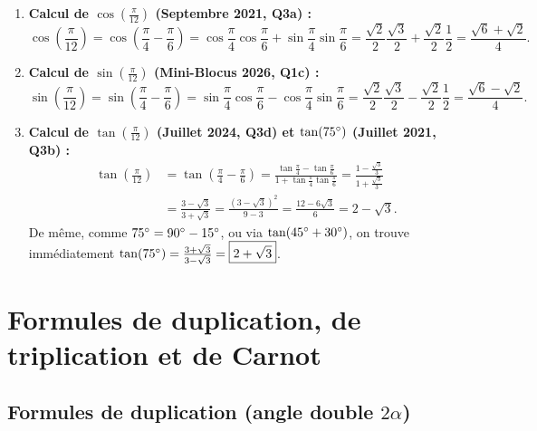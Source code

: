 \begin{exemple}
\begin{enumerate}
    \item \textbf{Calcul de $\cos\left(\frac{\pi}{12}\right)$ (Septembre 2021, Q3a) :}
    \[
        \cos\left(\frac{\pi}{12}\right) = \cos\left(\frac{\pi}{4} - \frac{\pi}{6}\right) = \cos\frac{\pi}{4}\cos\frac{\pi}{6} + \sin\frac{\pi}{4}\sin\frac{\pi}{6} = \frac{\sqrt{2}}{2}\frac{\sqrt{3}}{2} + \frac{\sqrt{2}}{2}\frac{1}{2} = \boxed{\frac{\sqrt{6} + \sqrt{2}}{4}}.
    \]
    \item \textbf{Calcul de $\sin\left(\frac{\pi}{12}\right)$ (Mini-Blocus 2026, Q1c) :}
    \[
        \sin\left(\frac{\pi}{12}\right) = \sin\left(\frac{\pi}{4} - \frac{\pi}{6}\right) = \sin\frac{\pi}{4}\cos\frac{\pi}{6} - \cos\frac{\pi}{4}\sin\frac{\pi}{6} = \frac{\sqrt{2}}{2}\frac{\sqrt{3}}{2} - \frac{\sqrt{2}}{2}\frac{1}{2} = \boxed{\frac{\sqrt{6} - \sqrt{2}}{4}}.
    \]
    \item \textbf{Calcul de $\tan\left(\frac{\pi}{12}\right)$ (Juillet 2024, Q3d) et $\tan(75\degree)$ (Juillet 2021, Q3b) :}
    \begin{align*}
        \tan\left(\frac{\pi}{12}\right) &= \tan\left(\frac{\pi}{4} - \frac{\pi}{6}\right) = \frac{\tan\frac{\pi}{4} - \tan\frac{\pi}{6}}{1 + \tan\frac{\pi}{4}\tan\frac{\pi}{6}} = \frac{1 - \frac{\sqrt{3}}{3}}{1 + \frac{\sqrt{3}}{3}} \\
        &= \frac{3 - \sqrt{3}}{3 + \sqrt{3}} = \frac{(3-\sqrt{3})^2}{9 - 3} = \frac{12 - 6\sqrt{3}}{6} = \boxed{2 - \sqrt{3}}.
    \end{align*}
    De même, comme $75\degree = 90\degree - 15\degree$, ou via $\tan(45\degree+30\degree)$, on trouve immédiatement $\tan(75\degree) = \frac{3+\sqrt{3}}{3-\sqrt{3}} = \boxed{2 + \sqrt{3}}$.
\end{enumerate}
\end{exemple}

\section{Formules de duplication, de triplication et de Carnot}

\subsection{Formules de duplication (angle double $2\alpha$)}

